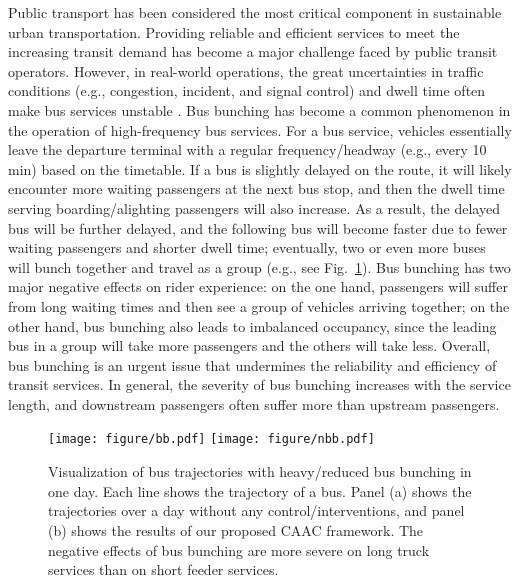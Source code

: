 \documentclass{article}
\begin{document}
Public transport has been considered the most critical component in sustainable urban transportation. Providing reliable and efficient services to meet the increasing transit demand has become a major challenge faced by public transit operators. However, in real-world operations, the great uncertainties in traffic conditions (e.g., congestion, incident, and signal control) and dwell time often make bus services unstable \cite{daganzo2019public}. Bus bunching has become a common phenomenon in the operation of high-frequency bus services. For a bus service, vehicles essentially leave the departure terminal with a regular frequency/headway (e.g., every 10 min) based on the timetable. If a bus is slightly delayed on the route, it will likely encounter more waiting passengers at the next bus stop, and then the dwell time serving boarding/alighting passengers will also increase. As a result, the delayed bus will be further delayed, and the following bus will become faster due to fewer waiting passengers and shorter dwell time; eventually, two or even more buses will bunch together and travel as a group (e.g., see Fig.~\ref{bb}). Bus bunching has two major negative effects on rider experience: on the one hand, passengers will suffer from long waiting times and then see a group of vehicles arriving together; on the other hand, bus bunching also leads to imbalanced occupancy, since the leading bus in a group will take more passengers and the others will take less. Overall, bus bunching is an urgent issue that undermines the reliability and efficiency of transit services. In general, the severity of bus bunching increases with the service length, and downstream passengers often suffer more than upstream passengers.



\begin{figure}[!b]
\centering
 \texttt{[image: figure/bb.pdf]} \qquad
\texttt{[image: figure/nbb.pdf]}
\caption{Visualization of bus trajectories with heavy/reduced bus bunching in one day. Each line shows the trajectory of a bus. Panel (a) shows the trajectories over a day without any control/interventions, and panel (b) shows the results of our proposed CAAC framework. The negative effects of bus bunching are more severe on long truck services than on short feeder services.}
\label{bb}
 \end{figure}
\end{document}
